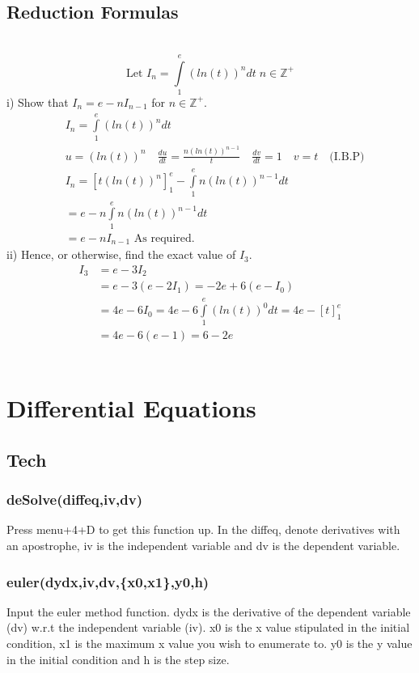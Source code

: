 \documentclass[a4paper,twoside,10pt]{article}
\newenvironment{example}[1]{%
	\mbox{}\\\tcolorbox[beamer,breakable,%
		title=Example: #1,standard jigsaw,opacityback=0, colframe=blue!75!black, boxrule=2pt]}{\endtcolorbox\mbox{}\\}
\begin{document}
		\subsection{Reduction Formulas}
			\begin{example}{Reduction Formulas Example 1}
				\[
					\text{Let } I_n=\int\limits_{1}^{e}(ln(t))^ndt\;n\in\mathbb{Z}^+
				\]
				i) Show that $I_n=e-nI_{n-1}$ for $n\in\mathbb{Z}^+$.\\
					\begin{align*}
						&I_n=\int\limits_{1}^{e}(ln(t))^ndt \\
						&u=(ln(t))^n \quad \frac{du}{dt}=\frac{n(ln(t))^{n-1}}{t} \quad \frac{dv}{dt}=1 \quad v=t \quad \text{(I.B.P)} \\
						&I_n=\left[t(ln(t))^n\right]_1^e-\int\limits_1^en(ln(t))^{n-1}dt \\
						&=e-n\int\limits_1^en(ln(t))^{n-1}dt \\
						&=e-nI_{n-1} \text{ As required}.
					\end{align*}
				ii) Hence, or otherwise, find the exact value of $I_3$.\\
					\begin{align*}
						I_3&=e-3I_2\\
						&=e-3(e-2I_1)=-2e+6(e-I_0) \\
						&=4e-6I_0=4e-6\int\limits_1^e(ln(t))^0dt=4e-\left[t\right]^e_1\\
						&=4e-6(e-1)=6-2e
					\end{align*}
			\end{example}
	\section{Differential Equations}
		\subsection{Tech}
			\subsubsection{deSolve(diffeq,iv,dv)} Press menu+4+D to get this function up. In the diffeq, denote derivatives with an apostrophe, iv is the independent variable and dv is the dependent variable.
			
			\subsubsection{euler(dydx,iv,dv,\{x0,x1\},y0,h)} Input the euler method function. dydx is the derivative of the dependent variable (dv) w.r.t the independent variable (iv). x0 is the x value stipulated in the initial condition, x1 is the maximum x value you wish to enumerate to. y0 is the y value in the initial condition and h is the step size.
\end{document}
